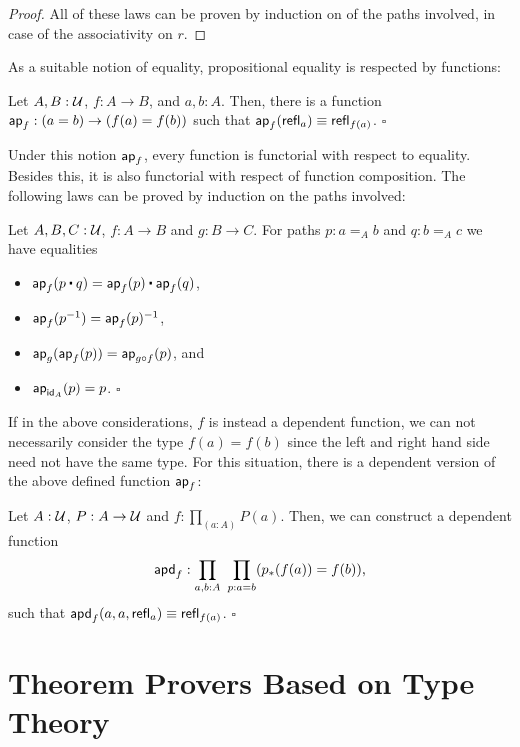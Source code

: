 \begin{proof}
All of these laws can be proven by induction on of the paths involved,
in case of the associativity on $r$.
\end{proof}

As a suitable notion of equality, propositional equality is respected by
functions:
\begin{lemma}
Let $A, B : \mathcal{U}$, $f : A \to B$, and $a, b : A$. Then, there is a function
$\mathsf{ap}_f : (a = b) \to (f(a) = f(b))$ such that $\mathsf{ap}_f(\mathsf{refl}_a) \equiv \mathsf{refl}_{f(a)}$.
\hfill $\square$
\end{lemma}

Under this notion $\mathsf{ap}_f$, every function is functorial with respect to
equality.
Besides this, it is also functorial with respect of function composition.
The following laws can be proved by induction on the paths involved:
\begin{lemma}
Let $A, B, C : \mathcal{U}$, $f : A \to B$ and $g : B \to C$. For paths $p : a =_A b$ and
$q : b =_A c$ we have equalities
\begin{itemize}
\item $\ap_f(p \ct q) = \ap_f(p) \ct \ap_f(q)$,
\item $\mathsf{ap}_f(p^{-1}) = \mathsf{ap}_f(p)^{-1}$,
\item $\mathsf{ap}_g(\mathsf{ap}_f(p)) = \mathsf{ap}_{g \circ f}(p)$, and
\item $\mathsf{ap}_{\mathsf{id}_A}(p) = p$. \hfill $\square$
\end{itemize}
\end{lemma}

If in the above considerations, $f$ is instead a dependent function, we can not
necessarily consider the type $f(a) = f(b)$ since the left and right hand side
need not have the same type.
For this situation, there is a dependent version of the above defined function
$\mathsf{ap}_f$:
\begin{lemma}\label{thm:apd-hott}
Let $A : \mathcal{U}$, $P : A \to \mathcal{U}$ and $f : \prod_{(a : A)} P(a)$. Then, we can construct
a dependent function
\begin{equation*}
\mathsf{apd}_f : \prod_{a, b : A} ~ \prod_{p : a = b} (p_*(f(a)) = f(b)) \text{,}
\end{equation*}
such that $\mathsf{apd}_f(a, a, \mathsf{refl}_a) \equiv \mathsf{refl}_{f(a)}$. \hfill $\square$
\end{lemma}

\section{Theorem Provers Based on Type Theory}\label{sec:tt-provers}












